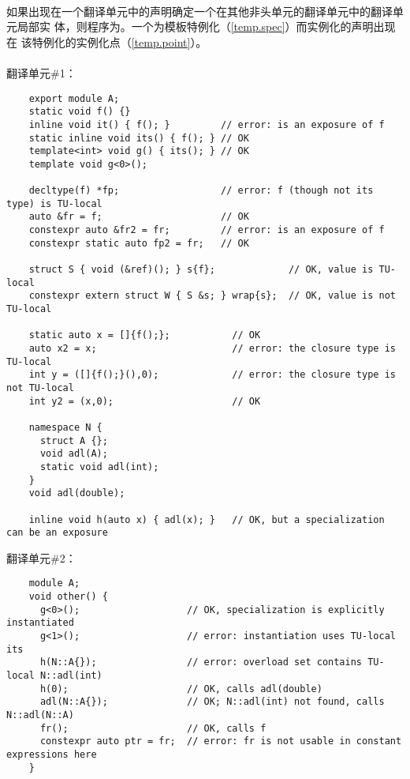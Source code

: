 \paragraph{} %
如果出现在一个翻译单元中的声明确定一个在其他非头单元的翻译单元中的翻译单元局部实
体，则程序为\illform{}。一个为模板特例化（\ref{temp.spec}）而实例化的声明出现在
该特例化的实例化点（\ref{temp.point}）。

\paragraph{} %
\begin{example}

  翻译单元\#1：
  \begin{lstlisting}
    export module A;
    static void f() {}
    inline void it() { f(); }         // error: is an exposure of f
    static inline void its() { f(); } // OK
    template<int> void g() { its(); } // OK
    template void g<0>();

    decltype(f) *fp;                  // error: f (though not its type) is TU-local
    auto &fr = f;                     // OK
    constexpr auto &fr2 = fr;         // error: is an exposure of f
    constexpr static auto fp2 = fr;   // OK

    struct S { void (&ref)(); } s{f};             // OK, value is TU-local
    constexpr extern struct W { S &s; } wrap{s};  // OK, value is not TU-local

    static auto x = []{f();};           // OK
    auto x2 = x;                        // error: the closure type is TU-local
    int y = ([]{f();}(),0);             // error: the closure type is not TU-local
    int y2 = (x,0);                     // OK

    namespace N {
      struct A {};
      void adl(A);
      static void adl(int);
    }
    void adl(double);

    inline void h(auto x) { adl(x); }   // OK, but a specialization can be an exposure
  \end{lstlisting}
  翻译单元\#2：
  \begin{lstlisting}
    module A;
    void other() {
      g<0>();                   // OK, specialization is explicitly instantiated
      g<1>();                   // error: instantiation uses TU-local its
      h(N::A{});                // error: overload set contains TU-local N::adl(int)
      h(0);                     // OK, calls adl(double)
      adl(N::A{});              // OK; N::adl(int) not found, calls N::adl(N::A)
      fr();                     // OK, calls f
      constexpr auto ptr = fr;  // error: fr is not usable in constant expressions here
    }
  \end{lstlisting}
\end{example}
